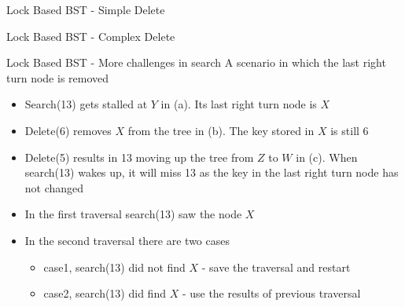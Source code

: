 \begin{frame}[c]{Lock Based BST - Simple Delete}

\end{frame}

\begin{frame}[c]{Lock Based BST - Complex Delete}

\end{frame}

\begin{frame}{Lock Based BST - More challenges in search}
A scenario in which the last right turn node is removed

\begin{itemize}
\item<1> \footnotesize Search(13) gets stalled at $Y$ in (a). Its last right turn node is $X$
\item<2> \footnotesize Delete(6) removes $X$ from the tree in (b). The key stored in $X$ is still 6
\item<3> \footnotesize Delete(5) results in 13 moving up the tree from $Z$ to $W$ in (c). When search(13) wakes up, it will miss 13 as the key in the last right turn node has not changed
\end{itemize}


\begin{itemize}
\item<4> \footnotesize In the first traversal search(13) saw the node $X$
\item<4> \footnotesize In the second traversal there are two cases
\begin{itemize}
\item<4> \tiny case1, search(13) did not find $X$ - save the traversal and restart
\item<4> \tiny case2, search(13) did find $X$ - use the results of previous traversal
\end{itemize}
\end{itemize}

\end{frame}
